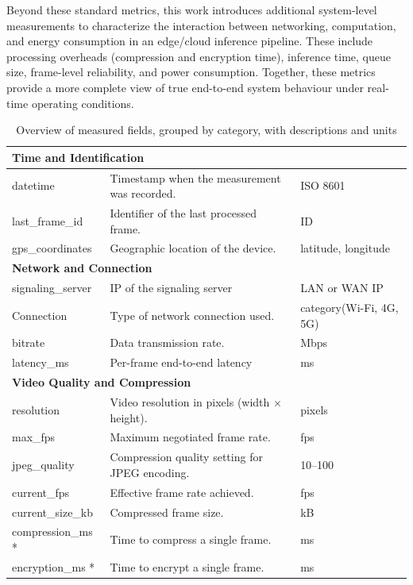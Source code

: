 \documentclass{ieeeaccess}
\begin{document}
Beyond these standard metrics, this work introduces additional system-level measurements to characterize the interaction between networking, computation, and energy consumption in an edge/cloud inference pipeline. These include processing overheads (compression and encryption time), inference time, queue size, frame-level reliability, and power consumption. Together, these metrics provide a more complete view of true end-to-end system behaviour under real-time operating conditions.


\begin{table}[h!]
\centering
\caption{Overview of measured fields, grouped by category, with descriptions and units}
\label{tab:metrics}
\begin{tabular}{|l|p{2.5cm}|l|}
\hline
\multicolumn{3}{|l|}{\textbf{Time and Identification}} \\ \hline
datetime & Timestamp when the measurement was recorded. & ISO 8601 \\ \hline
last\_frame\_id & Identifier of the last processed frame. & ID \\ \hline
gps\_coordinates & Geographic location of the device. & latitude, longitude \\ \hline

\multicolumn{3}{|l|}{\textbf{Network and Connection}} \\ \hline
signaling\_server & IP of the signaling server & LAN or WAN IP \\ \hline
Connection & Type of network connection used. & category(Wi-Fi, 4G, 5G) \\ \hline
bitrate & Data transmission rate. & Mbps \\ \hline
latency\_ms & Per-frame end-to-end latency & ms \\ \hline

\multicolumn{3}{|l|}{\textbf{Video Quality and Compression}} \\ \hline
resolution & Video resolution in pixels (width × height). & pixels \\ \hline
max\_fps & Maximum negotiated frame rate. & fps \\ \hline
jpeg\_quality & Compression quality setting for JPEG encoding. & 10--100 \\ \hline
current\_fps & Effective frame rate achieved. & fps \\ \hline
current\_size\_kb & Compressed frame size. & kB \\ \hline
compression\_ms * & Time to compress a single frame. & ms \\ \hline
encryption\_ms * & Time to encrypt a single frame. & ms \\ \hline


\end{tabular}
\end{table}
\end{document}
